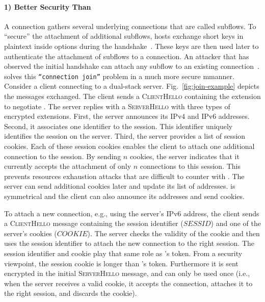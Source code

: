 \paragraph*{1) Better Security Than \mptcp} A \mptcp connection gathers several
underlying connections that are called subflows. To ``secure'' the attachment of
additional subflows, \mptcp hosts exchange short keys in plaintext inside \tcp
options during the \tcp handshake~\cite{rfc6824, rfc8684}. These keys are then
used later to authenticate the attachment of subflows to a connection. An
attacker that has observed the initial handshake can attach any subflow to an
existing \mptcp connection~\cite{rfc6181}.  \tcpls solves this
\texttt{``connection join''} problem in a much more secure mmanner. Consider a
client connecting to a dual-stack server. Fig.~\ref{fig:join-example} depicts
the \tls messages exchanged. The client sends a \textsc{ClientHello} containing
the \tcpls extension to negotiate \tcpls.  The server replies with a
\textsc{ServerHello} with three types of encrypted extensions.
First, the server announces its IPv4 and IPv6 addresses. Second, it
associates one identifier to the \tcpls session.  This identifier uniquely
identifies the \tcpls session on the server.  Third, the server provides a list
of \tcpls session cookies. Each of these session cookies enables the client to
attach one additional \tcp connection to the \tcpls session. By sending $n$
cookies, the server indicates that it currently accepts the attachment of only
$n$ \tcp connections to this session. This prevents resources exhaustion attacks
that are difficult to counter with \mptcp. The server can
send additional cookies later and update its list of addresses. \tcpls is
symmetrical and the client can also announce its addresses and send cookies.

To attach a new connection, e.g., using the server's IPv6 address, the client
sends a \textsc{ClientHello} message containing the session identifier
($SESSID$) and one of the server's cookies ($COOKIE$). The server checks the
validity of the cookie and then uses the session identifier to attach the new
\tcp connection to the right \tcpls session. The session identifier and cookie
play that same role as \mptcp's token. From a security viewpoint, the session
cookie is longer than \mptcp's token. Furthermore it is sent encrypted in the
initial \textsc{ServerHello} message, and can only be used once (i.e., when the
server receives a valid cookie, it accepts the connection, attaches it to the
right \tcpls session, and discards the cookie).


